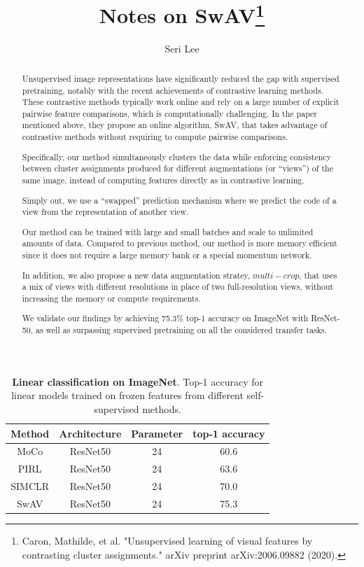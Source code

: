 \documentclass{tufte-handout}
\title{Notes on SwAV\thanks{Caron, Mathilde, et al. "Unsupervised learning of visual features by contrasting cluster assignments." arXiv preprint arXiv:2006.09882 (2020).}}
\author[The Tufte-LaTeX Developers]{Seri Lee}
\begin{document}
\maketitle%

\begin{abstract}
Unsupervised image representations have significantly reduced the gap with supervised pretraining, notably with the recent achievements of contrastive learning methods.
These contrastive methods typically work online and rely on a large number of explicit pairwise feature comparisons, which is computationally challenging.
In the paper mentioned above, they propose an online algorithm, SwAV, that takes advantage of contrastive methods without requiring to compute pairwise comparisons.

Specifically, our method simultaneously clusters the data while enforcing consistency between cluster assignments produced for different augmentations (or ``views'') of the same image,
instead of computing features directly as in contrastive learning.

Simply out, we use a ``swapped'' prediction mechanism where we predict the code of a view from the representation of another view.

Our method can be trained with large and small batches and scale to unlimited amounts of data.
Compared to previous method, our method is more memory efficient since it does not require a large memory bank or a special momentum network.

In addition, we also propose a new data augmentation stratey, $multi-crop$, that uses a mix of views with different resolutions in place of two full-resolution views, without increasing the memory or compute requirements.

We validate our findings by achieving 75.3\% top-1 accuracy on ImageNet with ResNet-50, as well as surpassing supervised pretraining on all the considered transfer tasks.
\end{abstract}

  \begin{table}[ht]
    \centering
    \selectfont
    \begin{tabular}{cccc}
      \toprule
      Method & Architecture & Parameter & top-1 accuracy \\
      \midrule
      MoCo & ResNet50 & 24 & 60.6 \\
      PIRL & ResNet50 & 24 & 63.6 \\
      SIMCLR & ResNet50 & 24 & 70.0 \\
      SwAV & ResNet50 & 24 & 75.3 \\
      \bottomrule
    \end{tabular}
    \caption{\textbf{Linear classification on ImageNet}. Top-1 accuracy for linear models trained on frozen features from different self-supervised methods.}
    \label{tab:normaltab}
  \end{table}
\end{document}
